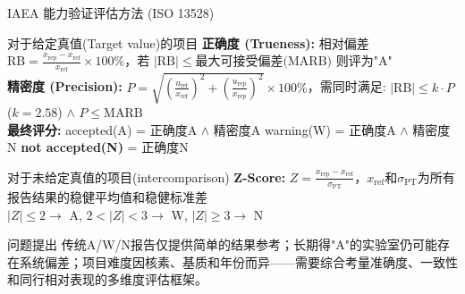 \documentclass[10pt,aspectratio=169]{beamer}
\begin{document}
\begin{frame}{IAEA 能力验证评估方法 (ISO 13528)}
  \small
  \begin{block}{\small  对于给定真值(Target value)的项目}
    \textbf{正确度 (Trueness):\;}
    相对偏差$\text{RB} = \frac{x_{\text{rep}} - x_{\text{ref}}}{x_{\text{ref}}} \times 100\%$，若 $|\text{RB}| \leq \text{最大可接受偏差(MARB)}$ 则评为"A"\\[1pt]
    \textbf{精密度 (Precision):\;}
    $P = \sqrt{(\frac{u_{\text{ref}}}{x_{\text{ref}}})^2 + (\frac{u_{\text{rep}}}{x_{\text{rep}}})^2} \times 100\%$，需同时满足:\; $|\text{RB}| \leq k \cdot P$ ($k{=}2.58$) $\wedge$ $P \leq \text{MARB}$\\[1pt]
    \textbf{最终评分:\;}
    \textcolor{mainblue}{accepted(A)} = 正确度A $\wedge$ 精密度A \;
    \textcolor{accent}{warning(W)} = 正确度A $\wedge$ 精密度N \;
    \textbf{not accepted(N)} = 正确度N
  \end{block}
  \begin{block}{\small 对于未给定真值的项目(intercomparison)}
    \textbf{Z-Score:\;}
    $Z = \frac{x_{\text{rep}} - x_{\text{ref}}}{\sigma_{\text{PT}}}$，$x_{\text{ref}}$和$\sigma_{\text{PT}}$为所有报告结果的稳健平均值和稳健标准差\\
    $|Z|{\leq}2 {\to}$ A, $2{<}|Z|{<}3 {\to}$ W, $|Z|{\geq}3 {\to}$ N
  \end{block}
  \begin{block}{问题提出}
    传统A/W/N报告仅提供简单的结果参考；长期得"A"的实验室仍可能存在系统偏差；项目难度因核素、基质和年份而异——需要\textcolor{accent}{综合考量准确度、一致性和同行相对表现的多维度评估框架}。
  \end{block}
\end{frame}
\end{document}
